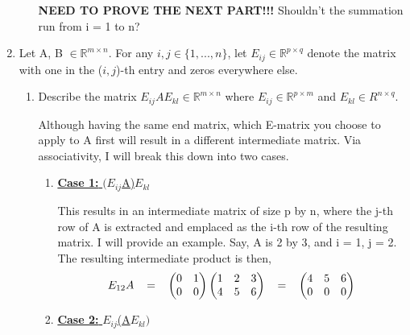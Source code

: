 \documentclass[12pt]{article}
\newcommand{\hop}{\vspace{1mm}}
\newcommand{\jump}{\vspace{5mm}}
\newcommand{\R}{\mathbb{R}}
\begin{document}
\begin{enumerate}[leftmargin=\labelsep]
\begin{enumerate}
\hop
\textbf{NEED TO PROVE THE NEXT PART!!!}
Shouldn't the summation run from i = 1 to n?
\end{enumerate}

\item Let A, B $\in \R^{m\times n}$. For any $i, j \in \{1, ..., n\}$, let $E_{ij} \in \R^{p \times q}$ denote the matrix with one in the ($i,j$)-th entry and zeros everywhere else.
\begin{enumerate}
    \item Describe the matrix $E_{ij}AE_{kl} \in \R^{m \times n}$ where $E_{ij} \in \R^{p\times m}$ and $E_{kl} \in R^{n \times q}.$ 

    \jump
    Although having the same end matrix, which E-matrix you choose to apply to A first will result in a different intermediate matrix. Via associativity, I will break this down into two cases.
\begin{enumerate}
    \item \underline{\textbf{Case 1:} $(E_{ij}$A)$E_{kl}$}

    \hop
    This results in an intermediate matrix of size p by n, where the j-th row of A is extracted and emplaced as the i-th row of the resulting matrix. I will provide an example. Say, A is 2 by 3, and i = 1, j = 2. The resulting intermediate product is then,
    \[
    E_{12}A
    \hspace{3mm}
    =
    \hspace{3mm}
    \begin{pmatrix}
        0   &1    \\
        0   &0    
    \end{pmatrix}
    \begin{pmatrix}
        1   &2  &3  \\
        4   &5  &6
    \end{pmatrix}
    \hspace{3mm}
    =
    \hspace{3mm}
    \begin{pmatrix}
        4   &5  &6  \\
        0   &0  &0
    \end{pmatrix}
    \]
    
    \hop
    \item \underline{\textbf{Case 2:} $E_{ij}$(A$E_{kl})$}
    

\end{enumerate}
\end{enumerate}
\end{enumerate}
\end{document}

